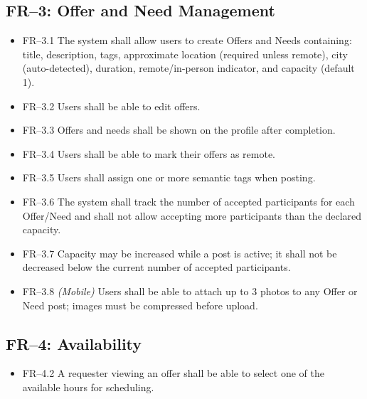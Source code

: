 \documentclass[11pt,a4paper]{report}
\begin{document}
\subsection{FR--3: Offer and Need Management}
\begin{itemize}
    \item FR--3.1 The system shall allow users to create Offers and Needs containing: title, description, tags, approximate location (required unless remote), city (auto-detected), duration, remote/in-person indicator, and capacity (default 1).
    \item FR--3.2 Users shall be able to edit offers.
    \item FR--3.3 Offers and needs shall be shown on the profile after completion.
    \item FR--3.4 Users shall be able to mark their offers as remote.
    \item FR--3.5 Users shall assign one or more semantic tags when posting.
    \item FR--3.6 The system shall track the number of accepted participants for each Offer/Need and shall not allow accepting more participants than the declared capacity.
    \item FR--3.7 Capacity may be increased while a post is active; it shall not be decreased below the current number of accepted participants.
    \item FR--3.8 \textit{(Mobile)} Users shall be able to attach up to 3 photos to any Offer or Need post; images must be compressed before upload.
\end{itemize}

\subsection{FR--4: Availability}
\begin{itemize}
    \item FR--4.2 A requester viewing an offer shall be able to select one of the available hours for scheduling.
\end{itemize}
\end{document}
